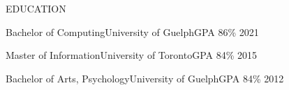 \documentclass[]{mcdowellcv}
\begin{document}
\begin{cvsection}{EDUCATION}
  \begin{cveducation}{Bachelor of Computing}{University of Guelph}{GPA 86\% 2021}
  \end{cveducation}

  \begin{cveducation}{Master of Information}{University of Toronto}{GPA 84\% 2015}
  \end{cveducation}

  \begin{cveducation}{Bachelor of Arts, Psychology}{University of Guelph}{GPA 84\% 2012}
  \end{cveducation}
\end{cvsection}
\end{document}
